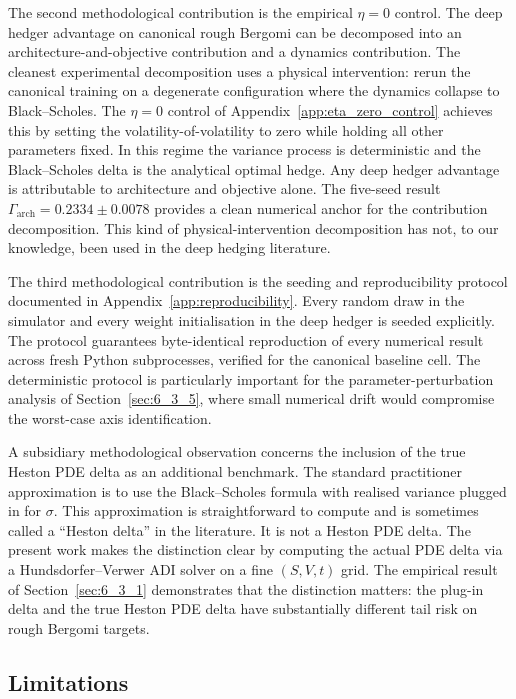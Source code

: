 \documentclass[12pt,a4paper]{article}
\theoremstyle{definition}
\theoremstyle{plain}
\theoremstyle{remark}
\theoremstyle{plain}
\begin{document}
The second methodological contribution is the empirical $\eta = 0$
control. The deep hedger advantage on canonical rough Bergomi can be
decomposed into an architecture-and-objective contribution and a
dynamics contribution. The cleanest experimental decomposition uses
a physical intervention: rerun the canonical training on a
degenerate configuration where the dynamics collapse to
Black--Scholes. The $\eta = 0$ control of
Appendix~\ref{app:eta_zero_control} achieves this by setting the
volatility-of-volatility to zero while holding all other parameters
fixed. In this regime the variance process is deterministic and the
Black--Scholes delta is the analytical optimal hedge. Any deep
hedger advantage is attributable to architecture and objective
alone. The five-seed result $\Gamma_{\mathrm{arch}} = 0.2334 \pm 0.0078$
provides a clean numerical anchor for the contribution decomposition.
This kind of physical-intervention decomposition has not, to our
knowledge, been used in the deep hedging literature.

The third methodological contribution is the seeding and
reproducibility protocol documented in
Appendix~\ref{app:reproducibility}. Every random draw in the
simulator and every weight initialisation in the deep hedger is
seeded explicitly. The protocol guarantees byte-identical
reproduction of every numerical result across fresh Python
subprocesses, verified for the canonical baseline cell. The
deterministic protocol is particularly important for the
parameter-perturbation analysis of Section~\ref{sec:6_3_5}, where
small numerical drift would compromise the worst-case axis
identification.

A subsidiary methodological observation concerns the inclusion of
the true Heston PDE delta as an additional benchmark. The standard
practitioner approximation is to use the Black--Scholes formula
with realised variance plugged in for $\sigma$. This approximation
is straightforward to compute and is sometimes called a ``Heston
delta'' in the literature. It is not a Heston PDE delta. The present
work makes the distinction clear by computing the actual PDE delta
via a Hundsdorfer--Verwer ADI solver on a fine $(S, V, t)$ grid. The
empirical result of Section~\ref{sec:6_3_1} demonstrates that the
distinction matters: the plug-in delta and the true Heston PDE delta
have substantially different tail risk on rough Bergomi targets.

\subsection{Limitations}
\label{sec:7_4_limitations}
\end{document}

